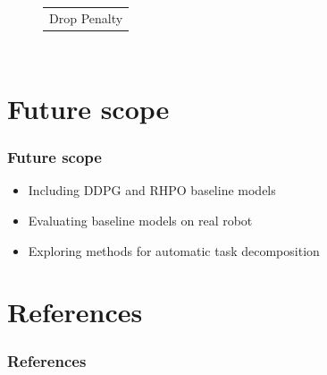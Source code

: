 \documentclass{beamer}
\begin{document}
\begin{frame}
\begin{columns}[c]
\begin{figure}
\begin{tabular}{c}
					{\small Drop Penalty} \\
				\end{tabular}
			\end{figure}
		\end{columns}
	\end{frame}

	\section{Future scope}
	\begin{frame}
		\frametitle{Future scope}
		
		\begin{itemize}
			\item Including DDPG and RHPO baseline models
			\item Evaluating baseline models on real robot
			\item Exploring methods for automatic task decomposition
		\end{itemize}
	\end{frame}

	\section{References}
	\begin{frame}
		\frametitle{References}
		
		
				
	\end{frame}
	
\end{document}
